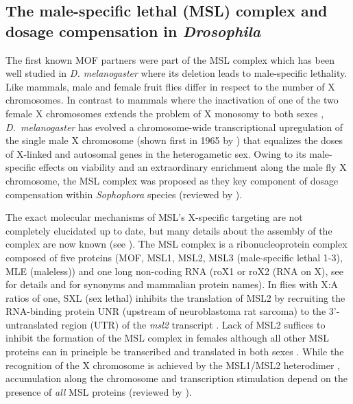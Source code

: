%
\subsection{The male-specific lethal (MSL) complex and dosage compensation in \textit{Drosophila}}
%
The first known MOF partners were part of the MSL complex which has been well studied in \textit{D. melano\-gaster} where its deletion leads to male-specific lethality.
Like mammals, male and female fruit flies differ in respect to the number of X chromosomes. In contrast to mammals where the inactivation of one of the two female X chromosomes extends the problem of X monosomy to both sexes \citep{Wright2012}, \textit{D.~melano\-gaster} has evolved a chromosome-wide transcriptional upregulation of the single male X chromosome (shown first in 1965 by \citet{Mukherjee1965}) that equalizes the doses of X-linked and autosomal genes in the heterogametic sex. Owing to its male-specific effects on viability and an extraordinary enrichment along the male fly X chromosome, the MSL complex was proposed as they key component of dosage compensation within \textit{Sophophora} species \citep{Ruiz2000} (reviewed by \citet{Laverty2010}).

The exact molecular mechanisms of MSL’s X-specific targeting are not completely elucidated up to date, but many details about the assembly of the complex are now known (see ). The MSL complex is a ribonucleoprotein complex composed of five proteins (MOF, MSL1, MSL2, MSL3 (male-specific lethal 1-3), MLE (maleless)) and one long non-coding RNA (roX1 or roX2 (RNA on X), see  for details and  for synonyms and mammalian protein names). In flies with X:A ratios of one, SXL (sex lethal) inhibits the translation of MSL2 by recruiting the RNA-binding protein UNR (upstream of neuroblastoma rat sarcoma) to the 3’-untranslated region (UTR) of the \textit{msl2} transcript \citep{Abaza2006, Duncan2006, Hennig2014}. Lack of MSL2 suffices to inhibit the formation of the MSL complex in females although all other MSL proteins can in principle be transcribed and translated in both sexes \citep{Gorman1995, Bhadra1999}. While the recognition of the X chromosome is achieved by the MSL1/MSL2 heterodimer \citep{Lyman1997, Kadlec2011}, accumulation along the chromosome and transcription stimulation depend on the presence of \textit{all} MSL proteins (reviewed by \citet{Conrad2011}).

